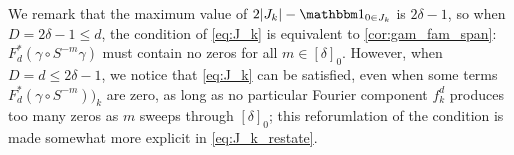 We remark that the maximum value of $2 \abs{J_k} - \one_{0 \in J_k}$ is $2 \delta - 1$, so when $D = 2 \delta - 1 \le d$, the condition of \eqref{eq:J_k} is equivalent to \cref{cor:gam_fam_span}: $F_d^* (\gamma \circ S^{-m} \gamma)$ must contain no zeros for all $m \in [\delta]_0$.  However, when $D = d \le 2 \delta - 1$, we notice that \eqref{eq:J_k} can be satisfied, even when some terms $F_d^* (\gamma \circ S^{-m}))_k$ are zero, as long as no particular Fourier component $f_k^d$ produces too many zeros as $m$ sweeps through $[\delta]_0$; this reforumlation of the condition is made somewhat more explicit in \eqref{eq:J_k_restate}.
